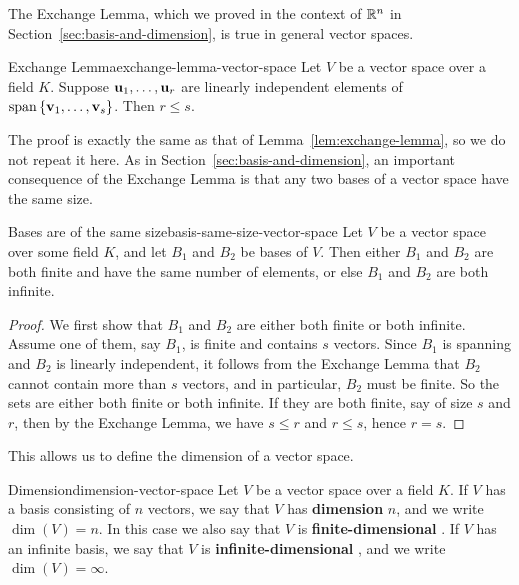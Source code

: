 The Exchange Lemma, which we proved in the context of $\mathbb{R}^n$ in
Section~\ref{sec:basis-and-dimension}, is true in general vector
spaces.

\begin{lemma}{Exchange Lemma}{exchange-lemma-vector-space}
  Let $V$ be a vector space over a field $K$. Suppose
  $\mbox{\bf u}_{1},\ldots,\mbox{\bf u}_{r}$ are linearly independent elements
  of $\sspan\set{\vect{v}_{1},\ldots,\vect{v}_{s}}$. Then $r\leq s$.
\end{lemma}

The proof is exactly the same as that of
Lemma~\ref{lem:exchange-lemma}, so we do not repeat it here.  As in
Section~\ref{sec:basis-and-dimension}, an important consequence of the
Exchange Lemma is that any two bases of a vector space have the same
size.

\begin{theorem}{Bases are of the same size}{basis-same-size-vector-space}
  Let $V$ be a vector space over some field $K$, and let $B_1$ and
  $B_2$ be bases of $V$. Then either $B_1$ and $B_2$ are both finite
  and have the same number of elements, or else $B_1$ and $B_2$ are
  both infinite.
\end{theorem}

\begin{proof}
  We first show that $B_1$ and $B_2$ are either both finite or both
  infinite. Assume one of them, say $B_1$, is finite and contains $s$
  vectors. Since $B_1$ is spanning and $B_2$ is linearly independent,
  it follows from the Exchange Lemma that $B_2$ cannot contain more
  than $s$ vectors, and in particular, $B_2$ must be finite.  So the
  sets are either both finite or both infinite. If they are both
  finite, say of size $s$ and $r$, then by the Exchange Lemma, we have
  $s\leq r$ and $r\leq s$, hence $r=s$.
\end{proof}

This allows us to define the dimension of a vector space.

\begin{definition}{Dimension}{dimension-vector-space}
  Let $V$ be a vector space over a field $K$. If $V$ has a basis
  consisting of $n$ vectors, we say that $V$ has \textbf{dimension}%
   $n$, and we write $\dim(V)=n$. In
  this case we also say that $V$ is \textbf{finite-dimensional}%
  . If $V$ has an infinite
  basis, we say that $V$ is \textbf{infinite-dimensional}%
  , and we write $\dim(V) = \infty$.
\end{definition}

